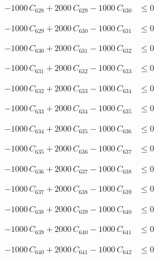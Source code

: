 \documentclass[a4paper,11pt]{article}
\begin{document}
\begin{align}
-1000\,C_{628} + 2000\,C_{629} - 1000\,C_{630} &\leq 0 \nonumber
\end{align}

\begin{align}
-1000\,C_{629} + 2000\,C_{630} - 1000\,C_{631} &\leq 0 \nonumber
\end{align}

\begin{align}
-1000\,C_{630} + 2000\,C_{631} - 1000\,C_{632} &\leq 0 \nonumber
\end{align}

\begin{align}
-1000\,C_{631} + 2000\,C_{632} - 1000\,C_{633} &\leq 0 \nonumber
\end{align}

\begin{align}
-1000\,C_{632} + 2000\,C_{633} - 1000\,C_{634} &\leq 0 \nonumber
\end{align}

\begin{align}
-1000\,C_{633} + 2000\,C_{634} - 1000\,C_{635} &\leq 0 \nonumber
\end{align}

\begin{align}
-1000\,C_{634} + 2000\,C_{635} - 1000\,C_{636} &\leq 0 \nonumber
\end{align}

\begin{align}
-1000\,C_{635} + 2000\,C_{636} - 1000\,C_{637} &\leq 0 \nonumber
\end{align}

\begin{align}
-1000\,C_{636} + 2000\,C_{637} - 1000\,C_{638} &\leq 0 \nonumber
\end{align}

\begin{align}
-1000\,C_{637} + 2000\,C_{638} - 1000\,C_{639} &\leq 0 \nonumber
\end{align}

\begin{align}
-1000\,C_{638} + 2000\,C_{639} - 1000\,C_{640} &\leq 0 \nonumber
\end{align}

\begin{align}
-1000\,C_{639} + 2000\,C_{640} - 1000\,C_{641} &\leq 0 \nonumber
\end{align}

\begin{align}
-1000\,C_{640} + 2000\,C_{641} - 1000\,C_{642} &\leq 0 \nonumber
\end{align}
\end{document}
